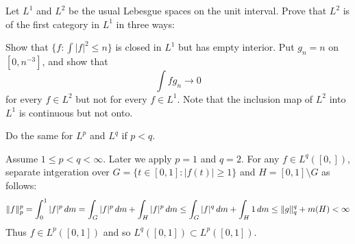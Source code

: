 \begin{enumerate}
\iffalse %
Assuming \(f_n = n^2\chi_{[0,1/n]}\), we compute
\begin{equation*}
\int_{-\infty}^\infty f_n(t)\phi(t)\,dt 
= \int_0^{1/n} n^2\phi(t)\,dt 
= - \int_0^{1/n} n^2t \phi'(t)\,dt.
\end{equation*}

we define \(F_n:\R\to\R\) 
\begin{equation*}
F_n(x) \eqdef   \left\{\begin{array}{ll}
                        0     &\qquad x \leq 0 \\     
                        n^2x  &\qquad 0 \leq x \leq 1/n \\     
                        n     &\qquad 1/n \leq x
                       \end{array}\right..
\end{equation*}
A tedious computation shows that
\begin{equation*}
\int_{-\infty}^\infty f_n(t)\phi(t)\,dt 
 = - \int_0^1 F_n(t)\phi'(t)\,dt.
\end{equation*}
\fi %


\begin{excopy}
Let \(L^1\) and \(L^2\) be the usual Lebesgue spaces on the unit interval.
Prove that \(L^2\) is of the first category in \(L^1\) in three ways:
\begin{itemize}
 Show that \(\{f: \int|f|^2\leq n\}\) is closed in \(L^1\)
 but has empty interior.
 Put \(g_n=n\) on \([0,n^{-3}]\), and show that 
 \begin{equation*}
  \int fg_n \to 0
 \end{equation*}
 for every \(f\in L^2\)
 but not for every \(f\in L^1\).
  Note that the inclusion map of \(L^2\) into  \(L^1\)
  is continuous but not onto.
\end{itemize}
 Do the same for \(L^p\) and \(L^q\) if \(p<q\).
\end{excopy}

Assume \(1\leq p<q < \infty\). Later we apply \(p=1\) and \(q=2\).
  For any \(f\in L^q([0,])\),
  separate intgeration over \(G = \{t\in[0,1]: |f(t)|\geq 1\}\)
  and \(H = [0,1]\setminus G\) 
  as follows:
  \begin{equation*}
  \|f\|_p^p
   = \int_0^1 |f|^p\,dm \\
   =    \int_G |f|^p\,dm + \int_H |f|^p\,dm \\
   \leq \int_G |f|^q\,dm + \int_H 1\,dm \\
   \leq \|g\|_q^q + m(H) < \infty
  \end{equation*}
  Thus \(f\in L^p([0,1])\) and so
  \(L^q([0,1])\subset L^p([0,1])\).


\end{enumerate}
